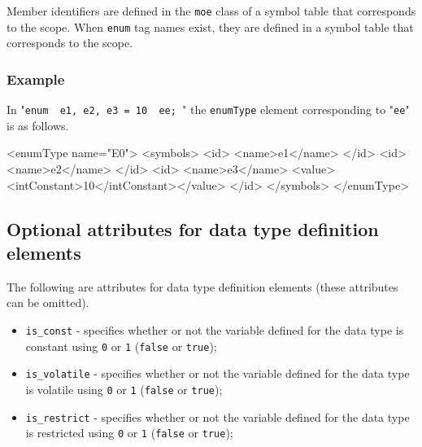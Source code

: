 Member identifiers are defined in the {\tt moe} class of a symbol table that corresponds to the scope.  When {\tt enum} tag names exist, they are defined in a symbol table that corresponds to the scope.

\subsubsection*{Example}

In "{\tt enum { e1, e2, e3 = 10 } ee; }" the {\tt enumType} element corresponding to "{\tt ee}" is as follows.

\begin{XcodeMLExample}
  <enumType name="E0">
    <symbols> 
      <id>
        <name>e1</name>
      </id>
      <id>
        <name>e2</name>
      </id>
      <id>
        <name>e3</name>
        <value><intConstant>10</intConstant></value>
      </id>
    </symbols>
  </enumType>
\end{XcodeMLExample}

\subsection{Optional attributes for data type definition elements}

The following are attributes for data type definition elements (these attributes can be omitted).

\begin{itemize}
\item {\tt is\_const} - specifies whether or not the variable defined for the data type is constant using {\tt 0} or {\tt 1} ({\tt false} or {\tt true});
\item {\tt is\_volatile} - specifies whether or not the variable defined for the data type is volatile using {\tt 0} or {\tt 1} ({\tt false} or {\tt true});
\item {\tt is\_restrict} - specifies whether or not the variable defined for the data type is restricted using {\tt 0} or {\tt 1} ({\tt false} or {\tt true});
\end{itemize}


